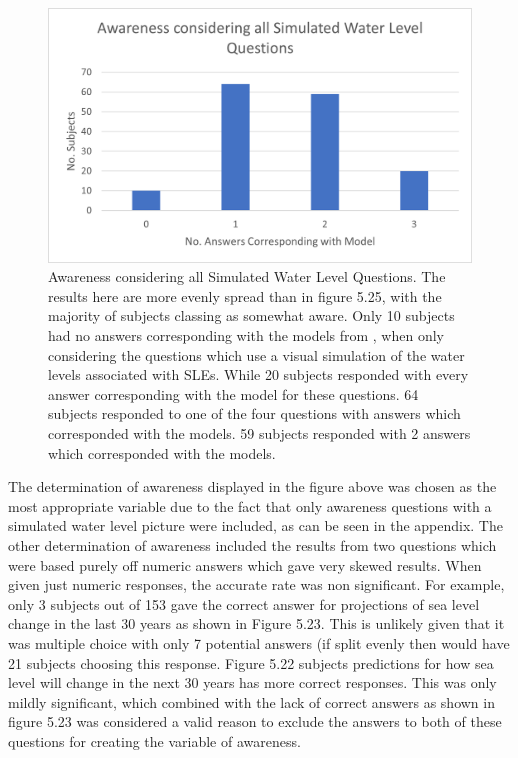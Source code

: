 \begin{figure}[H]
    \centering
    \includegraphics{fig_results/Awareness_ all_simulation_pictures_qs.png}
    \caption{Awareness considering all Simulated Water Level Questions. The results here are more evenly spread than in figure 5.25, with the majority of subjects classing as somewhat aware. Only 10 subjects had no answers corresponding with the models from \cite{kartverket_se_2020}, when only considering the questions which use a visual simulation of the water levels associated with SLEs. While 20 subjects responded with every answer corresponding with the model for these questions. 64 subjects responded to one of the four questions with answers which corresponded with the models. 59 subjects responded with 2 answers which corresponded with the models. }
    \label{fig:aware_all}
\end{figure}

The determination of awareness displayed in the figure above was chosen as the most appropriate variable due to the fact that only awareness questions with a simulated water level picture were included, as can be seen in the appendix. The other determination of awareness included the results from two questions which were based purely off numeric answers which gave very skewed results. When given just numeric responses, the accurate rate was non significant. For example, only 3 subjects out of 153 gave the correct answer for projections of sea level change in the last 30 years as shown in Figure 5.23.  This is unlikely given that it was multiple choice with only 7 potential answers (if split evenly then would have 21 subjects choosing this response. Figure 5.22 subjects predictions for how sea level will change in the next 30 years has more correct responses. This was only mildly significant, which combined with the lack of correct answers as shown in figure 5.23 was considered a valid reason to exclude the answers to both of these questions for creating the variable of awareness. 
